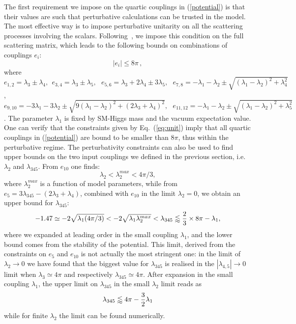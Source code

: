 \documentclass[12pt,a4paper]{article}
\begin{document}
The first requirement we impose on the quartic couplings in (\ref{potential}) is that their values are such that perturbative calculations can be trusted in the model.  The most effective way is to impose perturbative unitarity on all the scattering processes involving the scalars.
Following~\cite{Arhrib:2012ia}, we impose this condition on the full scattering matrix, which leads to the following bounds on combinations of couplings $e_i$:
%
\begin{equation}
\label{eq:unit}
|e_i|\leq 8\pi\,,
\end{equation}
where
$e_{1,2}= \lambda_3 \pm \lambda_4, \ \ e_{3,4}=\lambda_3 \pm \lambda_5, \ \ \
e_{5,6}= \lambda_3 + 2\lambda_4 \pm 3\lambda_5, \ \ \  e_{7,8} = -\lambda_1-\lambda_2 \pm \sqrt{(\lambda_1-\lambda_2)^2+\lambda_4^2}$, $e_{9,10} = -3\lambda_1 - 3\lambda_2 \pm \sqrt{9(\lambda_1 -\lambda_2)^2 + (2\lambda_3+\lambda_4)^2}, \ \ \ 
 e_{11,12} = -\lambda_1 - \lambda_2 \pm \sqrt{(\lambda_1 - \lambda_2)^2 + \lambda_5^2}
$.
The parameter $\lambda_1$ is fixed by SM-Higgs mass and the vacuum expectation value.
One can verify that the constraints given by Eq.~(\ref{eq:unit}) imply that all quartic couplings in (\ref{potential}) are bound to be smaller than $8\pi$, thus within the perturbative regime.
The perturbativity constraints can also be used to find upper bounds on the two input couplings we defined in the previous section, i.e. $\lambda_2$ and $\lambda_{345}$. From $e_{10}$ one finds:
\begin{equation}
\lambda_2<\lambda_2^{max} < 4\pi/3,
\end{equation}
where $\lambda_2^{max}$ is a function of  model parameters,
while from $e_5 = 3 \lambda_{345} - (2 \lambda_3 + \lambda_4)$, combined with $e_{10}$ in the limit $\lambda_2 = 0$, we obtain an upper bound for $\lambda_{345}$:
\begin{equation}
- 1.47 \simeq -2\sqrt{\lambda_1 (4\pi/3)} < -2\sqrt{\lambda_1\lambda_2^{max}}<\lambda_{345}\lessapprox {2\over 3} \times 8\pi - \lambda_1,
\label{eq:l345min}
\end{equation}
where we expanded at leading order in the small coupling $\lambda_1$, and the lower bound comes from the stability of the potential.
This limit, derived from the constraints on $e_5$ and $e_{10}$ is not actually the most stringent one:
in the limit of $\lambda_2 \to 0$ we have found  that the biggest value for $\lambda_{345}$
is realised in the  $|\lambda_{4,5}| \to 0$ limit when $\lambda_3 \simeq  4\pi$ 
and respectively  $\lambda_{345} \simeq 4\pi$.
After expansion in  the small coupling $\lambda_1$, the upper limit on  $\lambda_{345}$ in the small $\lambda_2 $ limit 
reads as 
\begin{equation}
\lambda_{345}\lessapprox 4\pi-{3\over 2}\lambda_1
\label{eq:l345max}
\end{equation}
while for finite  $\lambda_2 $ the limit can be found numerically.
\end{document}
